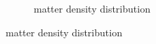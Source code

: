 \begin{figure}[hbtp]
\begin{subfigure}{0.70\textwidth}
        \caption{\pbEight\ matter density distribution}
        \label{DOMFitData_pb208_matterDensity}
    \end{subfigure}
\end{figure}
